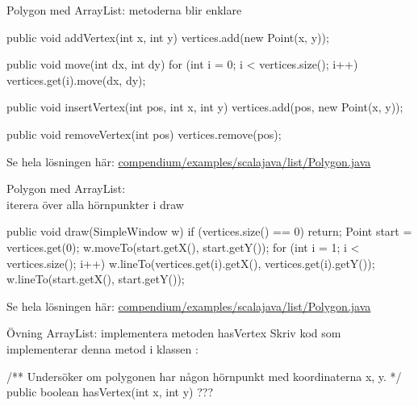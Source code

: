\begin{Slide}{Polygon med ArrayList: metoderna blir enklare}
\begin{Code}[numberstyle=]
    public void addVertex(int x, int y) {  
        vertices.add(new Point(x, y));
    }
    
    public void move(int dx, int dy) {
        for (int i = 0; i < vertices.size(); i++) {
        	vertices.get(i).move(dx, dy);
        }
    }
    
    public void insertVertex(int pos, int x, int y) {
    	vertices.add(pos, new Point(x, y));
    }
    
    public void removeVertex(int pos) {
    	vertices.remove(pos);
    }
\end{Code}

Se hela lösningen här:
\href{https://github.com/lunduniversity/introprog/tree/master/compendium/examples/scalajava/list/Polygon.java}{compendium/examples/scalajava/list/Polygon.java}
\end{Slide}

\begin{Slide}{Polygon med ArrayList: \\iterera över alla hörnpunkter i draw}
\begin{Code}[numberstyle=]
    public void draw(SimpleWindow w) {
        if (vertices.size() == 0) {
            return;
        }
        Point start = vertices.get(0);
        w.moveTo(start.getX(), start.getY());
        for (int i = 1; i < vertices.size(); i++) {
            w.lineTo(vertices.get(i).getX(), 
                     vertices.get(i).getY());
        }
        w.lineTo(start.getX(), start.getY());
    }
\end{Code}

Se hela lösningen här:
\href{https://github.com/lunduniversity/introprog/tree/master/compendium/examples/scalajava/list/Polygon.java}{compendium/examples/scalajava/list/Polygon.java}
\end{Slide}

\begin{Slide}{Övning ArrayList: implementera metoden hasVertex}
Skriv kod som implementerar denna metod i klassen :
\begin{Code}[numberstyle=]
/** Undersöker om polygonen har någon hörnpunkt med koordinaterna x, y. */ 
public boolean hasVertex(int x, int y) {
    ???
} 
\end{Code}
\end{Slide}

